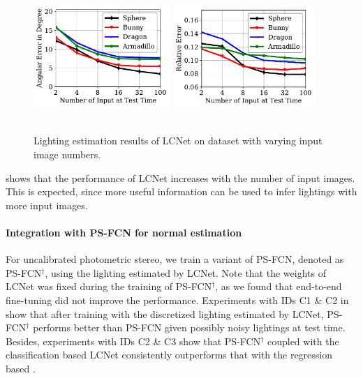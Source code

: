 \begin{figure}[htbp] \centering
    \includegraphics[width=0.46\textwidth]{ch-lcnet/images/Results/synth/SDPS-Net_img_sense_direction_img_num_sensitivity.pdf}
    \includegraphics[width=0.48\textwidth]{ch-lcnet/images/Results/synth/SDPS-Net_img_sense_intensity_img_num_sensitivity.pdf}
    \\ \vspace{-0.5em}
    \\
    \caption[Results of LCNet on \syntestMERL dataset with varying image numbers]{Lighting estimation results of LCNet on \syntestMERL dataset with varying input image numbers.} \label{fig:img_num_syn}
\end{figure}

 shows that the performance of LCNet increases with the number of input images. This is expected, since more useful information can be used to infer lightings with more input images.


\newcommand{\PSFCNdag}{PS-FCN$^\dag$\xspace}

\paragraph{Integration with PS-FCN for normal estimation}
For uncalibrated photometric stereo, we train a variant of PS-FCN, denoted as \PSFCNdag, using the lighting estimated by LCNet. 
Note that the weights of LCNet was fixed during the training of \PSFCNdag, as we found that end-to-end fine-tuning did not improve the performance.  
Experiments with IDs C1 \& C2 in  show that after training with the discretized lighting estimated by LCNet, \PSFCNdag performs better than PS-FCN given possibly noisy lightings at test time. Besides, experiments with IDs C2 \& C3 show that \PSFCNdag coupled with the classification based LCNet consistently outperforms that with the regression based \LCNetreg. 

